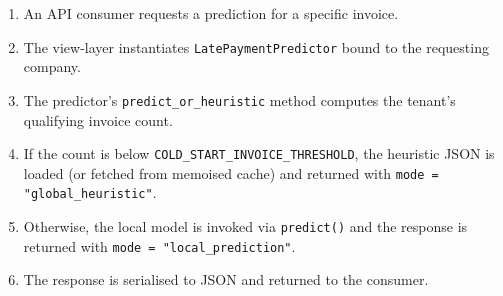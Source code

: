 \begin{enumerate}[label=\arabic*.]
  \item An API consumer requests a prediction for a specific invoice.
  \item The view-layer instantiates \texttt{LatePaymentPredictor} bound to the requesting company.
  \item The predictor's \texttt{predict\_or\_heuristic} method computes the tenant's qualifying invoice count.
  \item If the count is below \texttt{COLD\_START\_INVOICE\_THRESHOLD}, the heuristic JSON is loaded (or fetched from memoised cache) and returned with \texttt{mode = "global\_heuristic"}.
  \item Otherwise, the local model is invoked via \texttt{predict()} and the response is returned with \texttt{mode = "local\_prediction"}.
  \item The response is serialised to JSON and returned to the consumer.
\end{enumerate}
